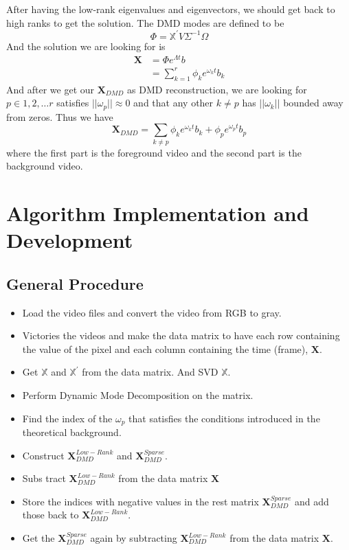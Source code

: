 \documentclass[twoside,twocolumn]{article}
\begin{document}
    After having the low-rank eigenvalues and eigenvectors, we should get back to high ranks to get the solution. The DMD modes
    are defined to be 
    \begin{equation*}
        \Phi = \mathbb{X^\prime}V\Sigma^{-1}\Omega
    \end{equation*}
    And the solution we are looking for is 
    \begin{align*}
        \mathbf{X}  &= \Phi e^{\Lambda t}b \\ 
                    &= \sum_{k=1}^{r} \phi_k e^{\omega_k t}b_k
    \end{align*}
    And after we get our $\mathbf{X}_{DMD}$ as DMD reconstruction, we are looking for $p \in{1, 2, \dots r}$ satisfies
    $|| \omega_p || \approx 0$ and that any other $k \neq p$ has $|| \omega_k ||$ bounded away from zeros. Thus we have
    \begin{equation*}
        \mathbf{X}_{DMD} = \sum_{k\neq p} \phi_k e^{\omega_k t}b_k + \phi_p e^{\omega_p t}b_p 
    \end{equation*}
    where the first part is the foreground video and the second part is the background video.


    \section{Algorithm Implementation and Development}
    \subsection{General Procedure}
    \begin{itemize}
        \item Load the video files and convert the video from RGB to gray.
        \item Victories the videos and make the data matrix to have each row containing the value of the pixel and each column
        containing the time (frame), $\mathbf{X}$.
        \item Get $\mathbb{X}$ and $\mathbb{X^\prime}$ from the data matrix. And SVD $\mathbb{X}$.
        \item Perform Dynamic Mode Decomposition on the matrix.
        \item Find the index of the $\omega_p$ that satisfies the conditions introduced in the theoretical background.
        \item Construct $\mathbf{X}_{DMD}^{Low-Rank}$ and $\mathbf{X}_{DMD}^{Sparse}$.
        \item Subs tract $\mathbf{X}_{DMD}^{Low-Rank}$ from the data matrix $\mathbf{X}$
        \item Store the indices with negative values in the rest matrix $\mathbf{X}_{DMD}^{Sparse}$ and add those back to
        $\mathbf{X}_{DMD}^{Low-Rank}$.
        \item Get the $\mathbf{X}_{DMD}^{Sparse}$ again by subtracting $\mathbf{X}_{DMD}^{Low-Rank}$ from the data matrix 
        $\mathbf{X}$.
    \end{itemize}
\end{document}
